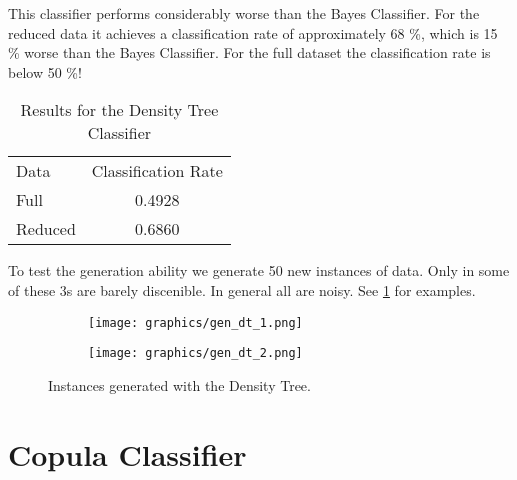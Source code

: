 \documentclass{article}
\begin{document}
This classifier performs considerably worse than the Bayes Classifier. For the reduced data it achieves a 
classification rate of approximately 68 \%, which is 15 \% worse than the Bayes Classifier. 
For the full dataset the classification rate is below 50 \%!

\begin{table}[h]
	\centering
	\begin{tabular}{l c}
		Data	&	Classification Rate	\\
		Full	&	0.4928				\\
	 	Reduced & 	0.6860				\\
	\end{tabular}
	\caption{Results for the Density Tree Classifier}
	\label{tab2}
\end{table}

To test the generation ability we generate 50 new instances of data.
Only in some of these 3s are barely discenible. In general all are noisy.
See \ref{fig2} for examples.

\begin{figure}[h]
	\centering
	\begin{subfigure}[b]{0.4\textwidth}
		\texttt{[image: graphics/gen\_dt\_1.png]}
	\end{subfigure}
	\begin{subfigure}[b]{0.4\textwidth}
		\texttt{[image: graphics/gen\_dt\_2.png]}
	\end{subfigure}
	\caption{Instances generated with the Density Tree.}
	\label{fig2}
\end{figure}

\section{Copula Classifier}
\end{document}
